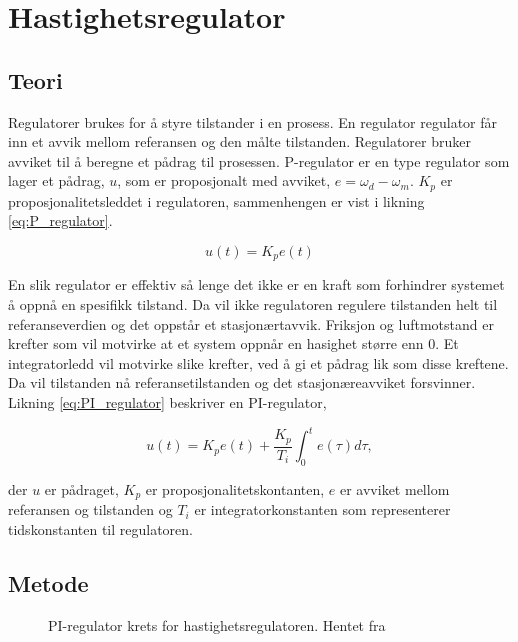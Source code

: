 \section{Hastighetsregulator}\label{sec:hastighetsreg}


\subsection{Teori}

Regulatorer brukes for å styre tilstander i en prosess. En regulator regulator får inn et avvik mellom referansen og den målte tilstanden. Regulatorer bruker avviket til å beregne et pådrag til prosessen. P-regulator er en type regulator som lager et pådrag, $u$,  som er proposjonalt med avviket, $e = \omega_d - \omega_m$. $K_p$ er proposjonalitetsleddet i regulatoren, sammenhengen er vist i likning \eqref{eq:P_regulator}.

\begin{equation}
    \label{eq:P_regulator}
    u(t) = K_p e(t)
\end{equation}

En slik regulator er effektiv så lenge det ikke er en kraft som forhindrer systemet å oppnå en spesifikk tilstand. Da vil ikke regulatoren regulere tilstanden helt til referanseverdien og det oppstår et stasjonærtavvik. Friksjon og luftmotstand er krefter som vil motvirke at et system oppnår en hasighet større enn $0$. Et integratorledd vil motvirke slike krefter, ved å gi et pådrag lik som disse kreftene. Da vil tilstanden nå referansetilstanden og det stasjonæreavviket forsvinner. Likning \eqref{eq:PI_regulator} beskriver en PI-regulator,

\begin{equation}
    \label{eq:PI_regulator}
    u(t) = K_p e(t) + \frac{K_p}{T_i} \int_{0}^{t} e(\tau) d\tau,
\end{equation}

der $u$ er pådraget, $K_p$ er proposjonalitetskontanten, $e$ er avviket mellom referansen og tilstanden og $T_i$ er integratorkonstanten som representerer tidskonstanten til regulatoren.

\subsection{Metode}

\begin{figure}[b]
    \centering
    
    \caption{PI-regulator krets for hastighetsregulatoren. Hentet fra \cite{AnalogMotorlabbOppgaver}}
    \label{fig:krets_hastighets_regulator}
\end{figure}

